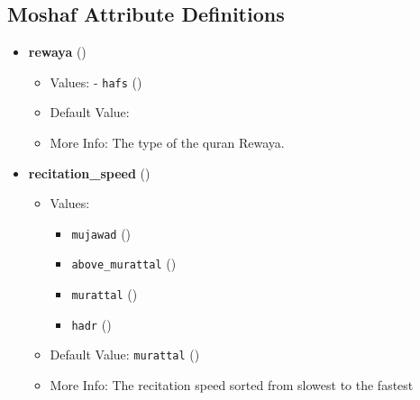  \subsection{Moshaf Attribute Definitions}
\label{sec:moshaf_attributes}
\begin{itemize}
\item \textbf{rewaya} ()
  \begin{itemize}
  \item Values: - \texttt{hafs} ()
  \item Default Value: 
  \item More Info: The type of the quran Rewaya.
  \end{itemize}

\item \textbf{recitation\_speed} ()
  \begin{itemize}
  \item Values: 
    \begin{itemize}
    \item  \texttt{mujawad} ()
    \item  \texttt{above\_murattal} ()
    \item  \texttt{murattal} ()
    \item  \texttt{hadr} ()
    \end{itemize}
  \item Default Value: \texttt{murattal} ()
  \item More Info: The recitation speed sorted from slowest to the fastest 
  \end{itemize}


\end{itemize}
